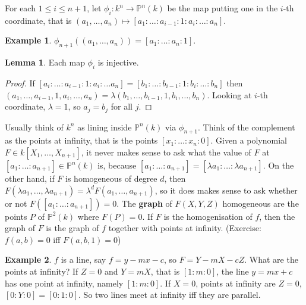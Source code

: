 \documentclass{article}
\renewcommand{\P}{\mathbb{P}}
\newcommand{\rb}[1]{\left( #1 \right)}
\renewcommand{\sb}[1]{\left[ #1 \right]}
\theoremstyle{definition}\newtheorem{definition}{Definition}[section]
\theoremstyle{definition}\newtheorem{remark}[definition]{Remark}
\theoremstyle{definition}\newtheorem*{example}{Example}
\theoremstyle{definition}\newtheorem*{note}{Note}
\newtheorem{lemma}[definition]{Lemma}
\begin{document}
For each $ 1 \le i \le n + 1 $, let $ \phi_i : k^n \to \P^n\rb{k} $ be the map putting one in the $ i $-th coordinate, that is $ \rb{a_1, \dots, a_n} \mapsto \sb{a_1 : \dots : a_{i - 1} : 1 : a_i : \dots : a_n} $.

\begin{example}
$ \phi_{n + 1}\rb{\rb{a_1, \dots, a_n}} = \sb{a_1 : \dots : a_n : 1} $.
\end{example}

\begin{lemma}
Each map $ \phi_i $ is injective.
\end{lemma}

\begin{proof}
If $ \sb{a_i : \dots : a_{i - 1} : 1 : a_i : \dots a_n} = \sb{b_1 : \dots : b_{i - 1} : 1 : b_i : \dots : b_n} $ then $ \rb{a_1, \dots, a_{i - 1}, 1, a_i, \dots, a_n} = \lambda\rb{b_1, \dots, b_{i - 1}, 1, b_i, \dots, b_n} $. Looking at $ i $-th coordinate, $ \lambda = 1 $, so $ a_j = b_j $ for all $ j $.
\end{proof}

Usually think of $ k^n $ as lining inside $ \P^n\rb{k} $ via $ \phi_{n + 1} $. Think of the complement as the points at infinity, that is the points $ \sb{x_1 : \dots : x_n : 0} $. Given a polynomial $ F \in k\sb{X_1, \dots, X_{n + 1}} $, it never makes sense to ask what the value of $ F $ at $ \sb{a_1 : \dots : a_{n + 1}} \in \P^n\rb{k} $ is, because $ \sb{a_1 : \dots : a_{n + 1}} = \sb{\lambda a_1 : \dots : \lambda a_{n + 1}} $. On the other hand, if $ F $ is homogeneous of degree $ d $, then $ F\rb{\lambda a_1, \dots, \lambda a_{n + 1}} = \lambda^d F\rb{a_1, \dots, a_{n + 1}} $, so it does makes sense to ask whether or not $ F\rb{\sb{a_1 : \dots : a_{n + 1}}} = 0 $. The \textbf{graph} of $ F\rb{X, Y, Z} $ homogeneous are the points $ P $ of $ \P^2\rb{k} $ where $ F\rb{P} = 0 $. If $ F $ is the homogenisation of $ f $, then the graph of $ F $ is the graph of $ f $ together with points at infinity. (Exercise: $ f\rb{a, b} = 0 $ iff $ F\rb{a, b, 1} = 0 $)

\begin{example}
$ f $ is a line, say $ f = y - mx - c $, so $ F = Y - mX - cZ $. What are the points at infinity? If $ Z = 0 $ and $ Y = mX $, that is $ \sb{1 : m : 0} $, the line $ y = mx + c $ has one point at infinity, namely $ \sb{1 : m : 0} $. If $ X = 0 $, points at infinity are $ Z = 0 $, $ \sb{0 : Y : 0} = \sb{0 : 1 : 0} $. So two lines meet at infinity iff they are parallel.
\end{example}
\end{document}

